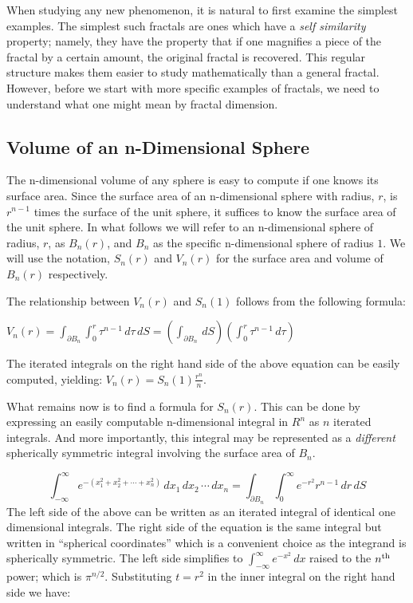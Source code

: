 {When studying any new phenomenon, it is natural to first examine the
simplest examples. The simplest such fractals are ones which have a
{\it self similarity} property; namely, they have the property that if
one magnifies a piece of the fractal by a certain amount, the original
fractal is recovered. This regular structure makes them easier to
study mathematically than a general fractal. However, before we start
with more specific examples of fractals, we need to understand what 
one might mean by fractal dimension.

\eject

\subsection{Volume of an n-Dimensional Sphere}
The n-dimensional volume of any sphere is easy to compute if one 
knows its surface area. Since the surface area of an n-dimensional sphere 
with radius, $r$, is $r^{n-1}$ times the surface of the unit sphere, 
it suffices to know the surface area of the unit sphere.
In what follows we will refer to an n-dimensional sphere of radius, $r$, 
as $B_n(r)$, and $B_n$ as the specific n-dimensional sphere of radius $1$.
We will use the notation, $S_n(r)$ and $V_n(r)$ for the surface area and volume 
of $B_n(r)$ respectively.

The relationship between $V_n(r)$ and $S_n(1)$ 
follows from the following formula:%

${V}_n(r) =  \int_{\partial B_n} \int_0^r \tau^{n-1} \,d\tau \,dS = \left(\int_{\partial B_n} \, dS\right) \left( \int_0^r \tau^{n-1} \, d\tau \right)$

The iterated integrals on the right hand side of the above equation can 
be easily computed, yielding: ${V}_n(r) = {S}_n(1) \frac{r^n}{n}$.

What remains now is to find a formula for $S_n(r).$
This can be done by expressing an easily computable 
n-dimensional integral in $R^n$ as $n$ iterated integrals. 
And more importantly, this integral may be represented as a {\it different\/} 
spherically symmetric integral involving the surface area of $B_n$.

$$
\int_{-\infty}^{\infty} e^{-(x_1^2 + x_2^2 + \cdots + x_n^2)} \, dx_1\, dx_2
\, \cdots \, dx_n = \int_{\partial B_n} \int_0^\infty e^{-r^2} r^{n-1} \,
dr\, dS
$$
The left side of the above can be written as an iterated integral of identical 
one dimensional integrals. The right side of the equation is the same 
integral but written in ``spherical coordinates'' which is a convenient choice as 
the integrand is spherically symmetric. The left side simplifies to 
$\int_{-\infty}^{\infty} e^{-x^2} \, dx$ raised to the $n^{\rm th}$ power;
which is $\pi^{n/2}$. Substituting $t = r^2$ in the inner integral on
the right hand side we have:

}
